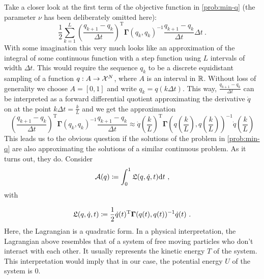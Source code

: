 Take a closer look at the first term of the objective function in \cref{prob:min-q} (the parameter $\nu$ has been deliberately omitted here):
\begin{equation}
	\label{eq:discrete-lagrangian}
	\frac{1}{2} \sum_{k=1}^{L} \left(\frac{q_{k+1} - q_k}{\Delta t}\right)^\mathrm{T} \mathbf{\Gamma}(q_k, q_k)^{-1} \frac{q_{k+1} - q_k}{\Delta t} \Delta t \ .
\end{equation}
With some imagination this very much looks like an approximation of the integral of some continuous function with a step function using $L$ intervals of width $\Delta t$.
This would require the sequence $q_k$ to be a discrete equidistant sampling of a function $q: A \rightarrow \mathcal{X}^N$, where $A$ is an interval in $\mathbb{R}$.
Without loss of generality we choose $A = [0, 1]$ and write $q_k = q(k \Delta t)$.
This way, $\frac{q_{k+1} - q_k}{\Delta t}$ can be interpreted as a forward differential quotient approximating the derivative $\dot{q}$ on at the point $k \Delta t = \frac{k}{L}$ and we get the approximation
\begin{equation}
	\left(\frac{q_{k+1} - q_k}{\Delta t}\right)^\mathrm{T} \mathbf{\Gamma}(q_k, q_k)^{-1} \frac{q_{k+1} - q_k}{\Delta t} 
	\approx \dot{q}\left(\frac{k}{L}\right)^\mathrm{T} \mathbf{\Gamma}\left(q\left(\frac{k}{L}\right), q\left(\frac{k}{L}\right)\right)^{-1}\dot{q}\left(\frac{k}{L}\right)
\end{equation}
This leads us to the obvious question if the solutions of the problem in \cref{prob:min-q} are also approximating the solutions of a similar continuous problem.
As it turns out, they do.
Consider 
\begin{equation}
\label{eq:action}
	\mathcal{A}(q) \coloneqq \int_{0}^{1} \mathfrak{L}(q, \dot{q}, t) \mathrm{d}t \ ,
\end{equation}
with

\begin{equation}
\label{eq:lagrangian}
	\mathfrak{L}(q, \dot{q}, t) \coloneqq \frac{1}{2} \dot{q}(t)^\mathrm{T} \mathbf{\Gamma}(q(t), q(t))^{-1} \dot{q}(t) \ .
\end{equation}
Here, the Lagrangian is a quadratic form.
In a physical interpretation, the Lagrangian above resembles that of a system of free moving particles who don't interact with each other.
It usually represents the kinetic energy $T$ of the system.
This interpretation would imply that in our case, the potential energy $U$ of the system is $0$.

